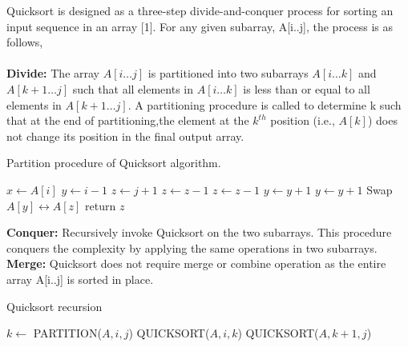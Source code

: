 \documentclass[letter,11pt,twocolumn]{article}
\begin{document}
Quicksort is designed as a three-step divide-and-conquer process for sorting an input sequence in
an array [1]. For any given subarray, A[i..j], the
process is as follows,\\\\
\textbf{Divide:} The array $A[i\dots j]$ is partitioned into two
subarrays $A[i\dots k]$ and $A[k+1\dots j]$ such that all elements in $A[i\dots k]$ is less than or equal to all elements
in $A[k + 1\dots j]$. A partitioning procedure is called to
determine k such that at the end of partitioning,the element at the $k^{th}$ position (i.e., $A[k]$) does not change its position in the final output array.\\
\begin{algorithm}
  \caption{Partition procedure of Quicksort
algorithm.}
  \label{algo:ins_sort1}
  \begin{algorithmic}[1]
     \newline
     \newline
      \State $x \leftarrow A[i]$
      \State $y \leftarrow i - 1 $
      \State $z \leftarrow j + 1$
          \State $z \leftarrow z-1$
             \State $z \leftarrow z-1$
             \EndWhile
           \State $y \leftarrow y+1$ 
            \State $y \leftarrow y+1$
            \EndWhile 
           \State Swap $A[y] \leftrightarrow A[z]$
         \Else
            \State return $z$
         \EndIf
      \EndWhile
     \EndProcedure 
  \end{algorithmic}
\end{algorithm}

\textbf{Conquer:} Recursively invoke Quicksort on the two subarrays. This procedure conquers the complexity by applying the same operations in two subarrays.\\
\textbf{Merge:} Quicksort does not require merge or combine operation as the entire array A[i..j] is sorted in place.


\begin{algorithm}
  \caption{Quicksort recursion}
  \label{algo:ins_sort2}
  \begin{algorithmic}[1]
     \newline
         \State $k \leftarrow $ PARTITION($A,i,j$)
         \State QUICKSORT($A,i,k$)
         \State QUICKSORT($A,k+1,j$)
      \EndIf      
     \EndProcedure 
  \end{algorithmic}
\end{algorithm}
\end{document}
